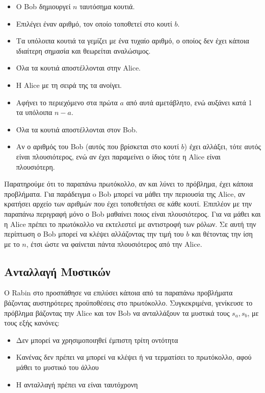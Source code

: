 \begin{itemize}
\item Ο Bob δημιουργεί $n$ ταυτόσημα κουτιά. 
\item Επιλέγει έναν αριθμό, τον οποίο τοποθετεί στο κουτί $b$.
\item Τα υπόλοιπα κουτιά τα γεμίζει με ένα τυχαίο αριθμό, ο οποίος δεν έχει κάποια ιδιαίτερη σημασία και θεωρείται αναλώσιμος.
\item Όλα τα κουτιά αποστέλλονται στην Alice.
\item H Alice με τη σειρά της τα ανοίγει. 
\item Αφήνει το περιεχόμενο στα πρώτα $a$ από αυτά αμετάβλητο, ενώ αυξάνει κατά 1 τα υπόλοιπα $n-a$.
\item Όλα τα κουτιά αποστέλλονται στον Bob.
\item Αν ο αριθμός του Bob (αυτός που βρίσκεται στο κουτί $b$) έχει αλλάξει, τότε αυτός είναι πλουσιότερος, ενώ αν έχει παραμείνει ο ίδιος τότε η Alice είναι πλουσιότερη.
\end{itemize}

Παρατηρούμε ότι το παραπάνω πρωτόκολλο, αν και λύνει το πρόβλημα, έχει κάποια προβλήματα. Για παράδειγμα o Bob μπορεί να μάθει την περιουσία της Alice, αν κρατήσει αρχείο των αριθμών που έχει τοποθετήσει σε κάθε κουτί. Επιπλέον με την παραπάνω περιγραφή μόνο ο Bob μαθαίνει ποιος είναι πλουσιότερος. Για να μάθει και η Alice πρέπει το πρωτόκολλο να εκτελεστεί με αντιστροφή των ρόλων. Σε αυτή την περίπτωση ο Bob μπορεί να κλέψει αλλάζοντας την τιμή του $b$ και θέτοντας την ίση με το $n$, έτσι ώστε να φαίνεται πάντα πλουσιότερος από την Alice. 

\subsection{Ανταλλαγή Μυστικών}
Ο Rabin στο \cite{rabin_eos} προσπάθησε να επιλύσει κάποια από τα παραπάνω προβλήματα βάζοντας αυστηρότερες προϋποθέσεις στο πρωτόκολλο. Συγκεκριμένα, γενίκευσε το πρόβλημα βάζοντας την Alice και τον Bob να ανταλλάξουν τα μυστικά τους $s_a, s_b$, με τους εξής κανόνες:
\begin{itemize}
\item Δεν μπορεί να χρησιμοποιηθεί έμπιστη τρίτη οντότητα
\item Κανένας δεν πρέπει να μπορεί να κλέψει ή να τερματίσει το πρωτόκολλο, αφού μάθει το μυστικό του άλλου
\item H ανταλλαγή πρέπει να είναι ταυτόχρονη
\end{itemize}

